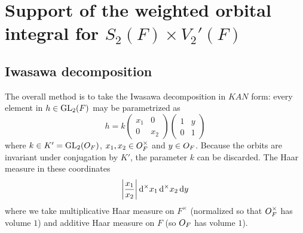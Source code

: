 \chapter{Support of the weighted orbital integral for $S_2(F) \times V_2'(F)$}
\label{ch:orbitalFJ1}

\section{Iwasawa decomposition}
The overall method is to take the Iwasawa decomposition in $KAN$ form:
every element in $h \in \operatorname{GL}_2(F)$ may be parametrized as
\[ h = k \begin{pmatrix} x_1 & 0 \\ 0 & x_2 \end{pmatrix}
  \begin{pmatrix} 1 & y \\ 0 & 1 \end{pmatrix} \]
where $k \in K' = \operatorname{GL}_2(O_F)$, $x_1, x_2 \in O_F^\times$ and $y \in O_F$.
Because the orbits are invariant under conjugation by $K'$,
the parameter $k$ can be discarded.
The Haar measure in these coordinates
\[ \left\lvert \frac{x_1}{x_2} \right\rvert \odif[\times] x_1 \odif[\times] x_2 \odif y \]
where we take multiplicative Haar measure on $F^\times$
(normalized so that $O_F^\times$ has volume $1$)
and additive Haar measure on $F$ (so $O_F$ has volume $1$).

